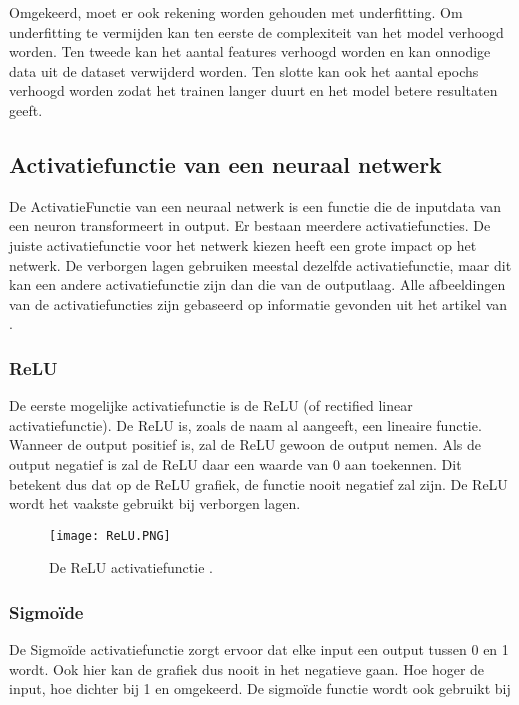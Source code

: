 Omgekeerd, moet er ook rekening worden gehouden met underfitting. Om underfitting te vermijden kan ten eerste de complexiteit van het model verhoogd worden. Ten tweede kan het aantal features verhoogd worden en kan onnodige data uit de dataset verwijderd worden. Ten slotte kan ook het aantal epochs verhoogd worden zodat het trainen langer duurt en het model betere resultaten geeft. \autocite{GeeksforGeeks2020}

\subsection{Activatiefunctie van een neuraal netwerk}
\label{sec:activatiefunctie}

De \gls{ActivatieFunctie} van een neuraal netwerk is een functie die de inputdata van een neuron transformeert in output. Er bestaan meerdere activatiefuncties. De juiste activatiefunctie voor het netwerk kiezen heeft een grote impact op het netwerk. De verborgen lagen gebruiken meestal dezelfde activatiefunctie, maar dit kan een andere activatiefunctie zijn dan die van de outputlaag. Alle afbeeldingen van de activatiefuncties zijn gebaseerd op informatie gevonden uit het artikel van \textcite{Brownlee2021}. 

\subsubsection{ReLU}
\label{sec:ReLU}

De eerste mogelijke activatiefunctie is de \gls{ReLU} (of rectified linear activatiefunctie). De ReLU is, zoals de naam al aangeeft, een lineaire functie. Wanneer de output positief is, zal de ReLU gewoon de output nemen. Als de output negatief is zal de ReLU daar een waarde van 0 aan toekennen. Dit betekent dus dat op de ReLU grafiek, de functie nooit negatief zal zijn. De ReLU wordt het vaakste gebruikt bij verborgen lagen. \autocite{Brownlee2021}

\begin{figure}[!htbp]
    \texttt{[image: ReLU.PNG]}
    \caption{\label{ReLU}De ReLU activatiefunctie \autocite{Brownlee2021}.}
\end{figure}
\FloatBarrier


\subsubsection{Sigmoïde}
\label{sec:sigmoide}

De \gls{Sigmoïde} activatiefunctie zorgt ervoor dat elke input een output tussen 0 en 1 wordt. Ook hier kan de grafiek dus nooit in het negatieve gaan. Hoe hoger de input, hoe dichter bij 1 en omgekeerd. De sigmoïde functie wordt ook gebruikt bij logistische regressie, maar dit wordt niet in deze bachelorproef besproken. \autocite{Brownlee2021} De sigmoïde activatiefunctie gebeurt als volgt:

